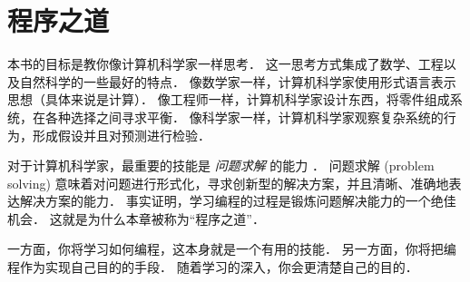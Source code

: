 



\chapter{程序之道}


本书的目标是教你像计算机科学家一样思考． 这一思考方式集成了数学、工程以及自然科学的一些最好的特点． 像数学家一样，计算机科学家使用形式语言表示思想（具体来说是计算）． 像工程师一样，计算机科学家设计东西，将零件组成系统，在各种选择之间寻求平衡． 像科学家一样，计算机科学家观察复杂系统的行为，形成假设并且对预测进行检验．
  


对于计算机科学家，最重要的技能是 {\em 问题求解} 的能力 ． 问题求解 (problem solving) 意味着对问题进行形式化，寻求创新型的解决方案，并且清晰、准确地表达解决方案的能力． 事实证明，学习编程的过程是锻炼问题解决能力的一个绝佳机会． 这就是为什么本章被称为“程序之道”．


一方面，你将学习如何编程，这本身就是一个有用的技能． 另一方面，你将把编程作为实现自己目的的手段． 随着学习的深入，你会更清楚自己的目的．

